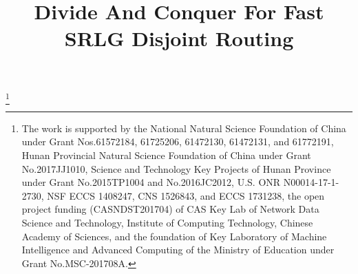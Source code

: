 \documentclass[10pt,conference]{IEEEtran}
\begin{document}

\title{Divide And Conquer For Fast SRLG Disjoint Routing}
\thanks{The work is supported  by the  National Natural Science Foundation of China under Grant Nos.61572184, 61725206, 61472130, 61472131, and 61772191,  Hunan Provincial Natural Science Foundation of China under Grant No.2017JJ1010,  Science and Technology Key Projects of Hunan Province under Grant No.2015TP1004 and No.2016JC2012,  U.S. ONR N00014-17-1-2730, NSF ECCS 1408247, CNS 1526843, and ECCS 1731238,  the open project funding (CASNDST201704) of CAS Key Lab of Network Data Science and Technology, Institute of Computing Technology, Chinese Academy of Sciences, and the foundation of Key Laboratory of Machine Intelligence and Advanced Computing of the Ministry of Education under Grant No.MSC-201708A.}
\end{document}
